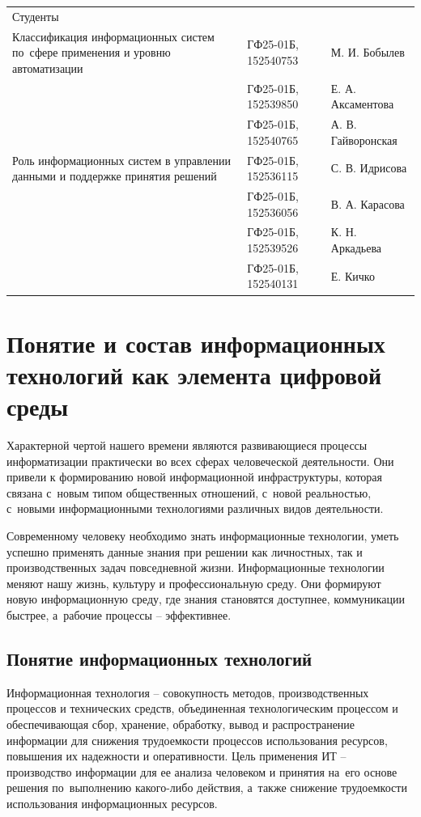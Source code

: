 \documentclass{ou}
\begin{document}
\begin{flushleft}
\doublespacing
\begin{tabularx}{\textwidth}{@{} p{} l l @{}}
Студенты     &                     &         \\
\multirow{-2.27}{\hsize}{\singlespacing Классификация информационных систем по~сфере применения и уровню автоматизации}
             & ГФ25-01Б, 152540753 & М. И. Бобылев\\
             & ГФ25-01Б, 152539850 & Е. А. Аксаментова\\
             & ГФ25-01Б, 152540765 & А. В. Гайворонская\\
\multirow{-2.27}{\hsize}{\singlespacing Роль информационных систем в управлении данными и поддержке принятия решений}
             & ГФ25-01Б, 152536115 & С. В. Идрисова\\
             & ГФ25-01Б, 152536056 & В. А. Карасова\\
             & ГФ25-01Б, 152539526 & К. Н. Аркадьева\\
             & ГФ25-01Б, 152540131 & Е. Кичко\\
\end{tabularx}
\end{flushleft}
\newpage
\tableofcontents
\newpage
\onehalfspacing
\section{Понятие и состав информационных технологий как элемента цифровой среды}
Характерной чертой нашего времени являются развивающиеся процессы информатизации практически во всех сферах человеческой деятельности. Они привели к формированию новой информационной инфраструктуры, которая связана с~новым типом общественных отношений, с~новой реальностью, с~новыми информационными технологиями различных видов деятельности. 

Современному человеку необходимо знать информационные технологии, уметь успешно применять данные знания при решении как личностных, так и производственных задач повседневной жизни. Информационные технологии меняют нашу жизнь, культуру и профессиональную среду. Они формируют новую информационную среду, где знания становятся доступнее, коммуникации быстрее, а~рабочие процессы -- эффективнее.
\subsection{Понятие информационных технологий}
Информационная технология -- совокупность методов, производственных процессов и технических средств, объединенная технологическим процессом и обеспечивающая сбор, хранение, обработку, вывод и распространение информации для снижения трудоемкости процессов использования ресурсов, повышения их надежности и оперативности. Цель применения ИТ -- производство информации для ее анализа человеком и принятия на~его основе решения по~выполнению какого-либо действия, а~также снижение трудоемкости использования информационных ресурсов.
\end{document}
